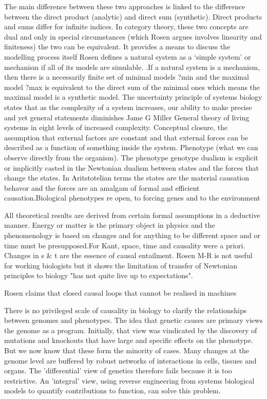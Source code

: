 \documentclass[onecollarge,runningheads]{svjour2}
\begin{document}
The main difference between these two approaches is linked to the difference between the direct product (analytic) and direct sum (synthetic). Direct products and sums differ for infinite indices. In category theory, these two concepts are dual and only in special circumstances (which Rosen argues involves linearity and finiteness) the two can be equivalent.
It provides a means to discuss the modelling process itself %
Rosen defines a natural system as
a ‘simple system’ or mechanism if all of its models are simulable. .If a natural system is a mechanism, then there is a necessarily finite set of minimal models ?min and the maximal model ?max is equivalent to the direct sum of the minimal ones which means the maximal model is a synthetic model. The uncertainty principle of systems biology states that as the complexity of a system increases, our ability to make precise and yet general statements diminishes
Jame G Miller General theory of living systems in eight levels of increased complexity.
Conceptual closure, the assumption that external factors are constant and that external forces can be described as a function of something inside the system. 
Phenotype (what we can observe directly from the organism). The phenotype genotype dualism is explicit or implicitly casted in the Newtonian dualism between states and the forces that change the states. In Aritstotelian terms the states are the material causation behavor and the forces are an amalgam of formal and efficient causation.Biological phenotypes re open, to forcing genes and to the environment

All theoretical results are derived from certain formal assumptions in a deductive manner. Energy or matter is the primary object in physics and the phenomenology is based on changes and for anything to be different space and or time must be presupposed.For Kant, space, time and causality were a priori. Changes in s & t are the essence of causal entailment. Rosen M-R is not useful for working biologists but it shows the limitation of transfer of Newtonian principles to biology "has not quite live up to expectations".

Rosen claims that closed causal loops that cannot be realised in machines


There is no privileged scale of causality in biology to clarify the relationships between genomes and phenotypes.  The idea that genetic causes are primary views the genome as a program. Initially, that view was vindicated by the discovery of mutations and knockouts that have large and specific effects on the phenotype. But we now know that these form the minority of cases. Many changes at the genome level are buffered by robust networks of interactions in cells, tissues and organs.  The 'differential' view of genetics therefore fails because it is too restrictive. An 'integral' view, using reverse engineering from systems biological models to quantify contributions to function, can solve this problem. %
\end{document}
